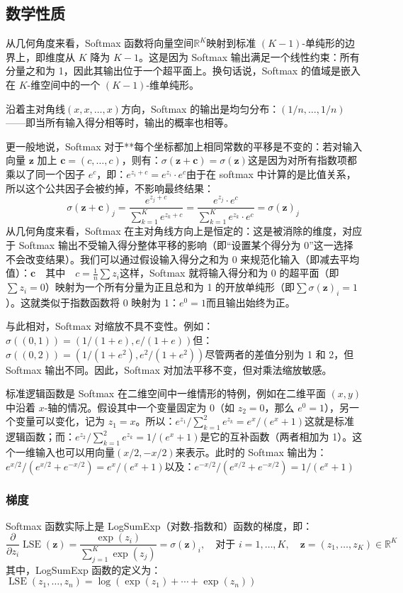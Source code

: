 \subsection{数学性质}
从几何角度来看，Softmax 函数将向量空间$\mathbb{R}^K$映射到标准 $(K - 1)$-单纯形的边界上，即维度从 $K$ 降为 $K - 1$。这是因为 Softmax 输出满足一个线性约束：所有分量之和为 1，因此其输出位于一个超平面上。换句话说，Softmax 的值域是嵌入在 $K$-维空间中的一个 $(K - 1)$-维单纯形。

沿着主对角线$(x, x, \dots, x)$方向，Softmax 的输出是均匀分布：$(1/n, \dots, 1/n)$——即当所有输入得分相等时，输出的概率也相等。

更一般地说，Softmax 对于**每个坐标都加上相同常数的平移是不变的：若对输入向量 $\mathbf{z}$ 加上 $\mathbf{c} = (c, \dots, c)$，则有：$\sigma(\mathbf{z} + \mathbf{c}) = \sigma(\mathbf{z})$这是因为对所有指数项都乘以了同一个因子 $e^c$，即：$e^{z_i + c} = e^{z_i} \cdot e^c$由于在 softmax 中计算的是比值关系，所以这个公共因子会被约掉，不影响最终结果：
$$
\sigma(\mathbf{z} + \mathbf{c})_j = \frac{e^{z_j + c}}{\sum_{k=1}^{K} e^{z_k + c}} = \frac{e^{z_j} \cdot e^c}{\sum_{k=1}^{K} e^{z_k} \cdot e^c} = \sigma(\mathbf{z})_j~
$$
从几何角度来看，Softmax 在主对角线方向上是恒定的：这是被消除的维度，对应于 Softmax 输出不受输入得分整体平移的影响（即“设置某个得分为 0”这一选择不会改变结果）。我们可以通过假设输入得分之和为 0 来规范化输入（即减去平均值）：$\mathbf{c} \quad \text{其中} \quad c = \frac{1}{n} \sum z_i$这样，Softmax 就将输入得分和为 0 的超平面（即$\sum z_i = 0$）映射为一个所有分量为正且总和为 1 的开放单纯形（即$\sum \sigma(\mathbf{z})_i = 1$）。这就类似于指数函数将 0 映射为 1：$e^0 = 1$而且输出始终为正。

与此相对，Softmax 对缩放不具不变性。例如：$\sigma((0, 1)) = \left( 1/(1 + e), e/(1 + e) \right)$但：$\sigma((0, 2)) = \left( 1/(1 + e^2), e^2/(1 + e^2) \right)$尽管两者的差值分别为 1 和 2，但 Softmax 输出不同。因此，Softmax 对加法平移不变，但对乘法缩放敏感。

标准逻辑函数是 Softmax 在二维空间中一维情形的特例，例如在二维平面 $(x, y)$ 中沿着 $x$-轴的情况。假设其中一个变量固定为 0（如 $z_2 = 0$，那么 $e^0 = 1$），另一个变量可以变化，记为 $z_1 = x$。所以：$e^{z_1}/\sum_{k=1}^{2} e^{z_k} = e^x/(e^x + 1)$这就是标准逻辑函数；而：$e^{z_2}/\sum_{k=1}^{2} e^{z_k} =1/(e^x + 1)$是它的互补函数（两者相加为 1）。这个一维输入也可以用向量$\left(x/2, -x/2\right)$来表示。此时的 Softmax 输出为：$e^{x/2}/(e^{x/2} + e^{-x/2}) = e^x/(e^x + 1)$以及：$e^{-x/2}/(e^{x/2} + e^{-x/2})= 1/(e^x + 1)$
\subsubsection{梯度}
Softmax 函数实际上是 LogSumExp（对数-指数和）函数的梯度，即：
$$
\frac{\partial}{\partial z_i} \operatorname{LSE}(\mathbf{z}) = \frac{\exp(z_i)}{\sum_{j=1}^{K} \exp(z_j)} = \sigma(\mathbf{z})_i,
\quad \text{对于 } i = 1, \dotsc, K,\quad \mathbf{z} = (z_1, \dotsc, z_K) \in \mathbb{R}^K~
$$
其中，LogSumExp 函数的定义为：$\operatorname{LSE}(z_1, \dots, z_n) = \log\left( \exp(z_1) + \cdots + \exp(z_n) \right)$

